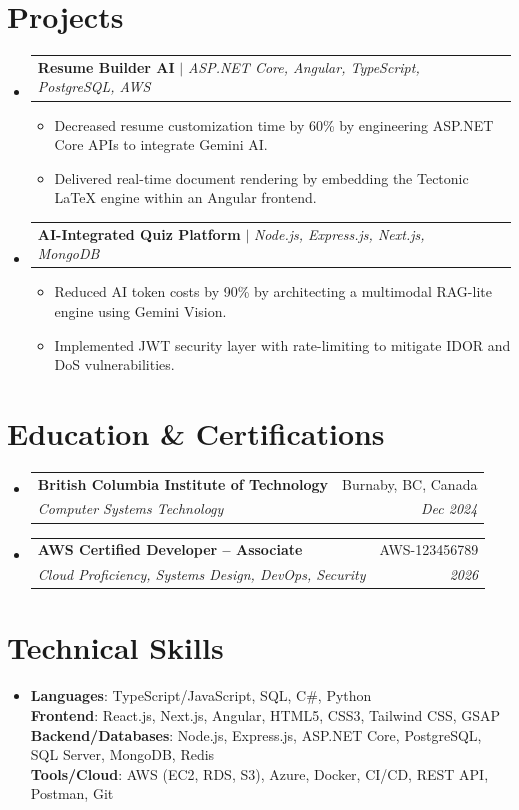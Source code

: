 \documentclass[letterpaper,11pt]{article}
\makeatletter
\newcommand{\resumeItem}[1]{
\item\small{
{#1 \vspace{-2pt}}
}
}
\newcommand{\resumeSubheading}[4]{
\vspace{-2pt}\item
\begin{tabular*}{0.97\textwidth}[t]{l@{\extracolsep{\fill}}r}
\textbf{#1} & #2 \\
\textit{\small#3} & \textit{\small #4} \\
\end{tabular*}\vspace{-7pt}
}
\newcommand{\resumeProjectHeading}[2]{
\item
\begin{tabular*}{0.97\textwidth}{l@{\extracolsep{\fill}}r}
\small#1 & #2 \\
\end{tabular*}\vspace{-7pt}
}
\newcommand{\resumeSubHeadingListStart}{\begin{itemize}[leftmargin=0.15in, label={}]}
\newcommand{\resumeSubHeadingListEnd}{\end{itemize}}
\newcommand{\resumeItemListStart}{\begin{itemize}}
\newcommand{\resumeItemListEnd}{\end{itemize}\vspace{-5pt}}
\makeatother
\begin{document}
\section{Projects}
\resumeSubHeadingListStart
\resumeProjectHeading{\textbf{Resume Builder AI} $|$ \emph{ASP.NET Core, Angular, TypeScript, PostgreSQL, AWS}}{}
\resumeItemListStart
\resumeItem{Decreased resume customization time by 60\% by engineering ASP.NET Core APIs to integrate Gemini AI.}
\resumeItem{Delivered real-time document rendering by embedding the Tectonic LaTeX engine within an Angular frontend.}
\resumeItemListEnd
\resumeProjectHeading{\textbf{AI-Integrated Quiz Platform} $|$ \emph{Node.js, Express.js, Next.js, MongoDB}}{}
\resumeItemListStart
\resumeItem{Reduced AI token costs by 90\% by architecting a multimodal RAG-lite engine using Gemini Vision.}
\resumeItem{Implemented JWT security layer with rate-limiting to mitigate IDOR and DoS vulnerabilities.}
\resumeItemListEnd
\resumeSubHeadingListEnd

\section{Education \& Certifications}
\resumeSubHeadingListStart
\resumeSubheading{British Columbia Institute of Technology}{Burnaby, BC, Canada}{Computer Systems Technology}{Dec 2024}
\resumeSubheading{AWS Certified Developer -- Associate}{AWS-123456789}{Cloud Proficiency, Systems Design, DevOps, Security}{2026}
\resumeSubHeadingListEnd

\section{Technical Skills}
\begin{itemize}[leftmargin=0.15in, label={}]
\item{
\textbf{Languages}{: TypeScript/JavaScript, SQL, C\#, Python} \\
\textbf{Frontend}{: React.js, Next.js, Angular, HTML5, CSS3, Tailwind CSS, GSAP} \\
\textbf{Backend/Databases}{: Node.js, Express.js, ASP.NET Core, PostgreSQL, SQL Server, MongoDB, Redis} \\
\textbf{Tools/Cloud}{: AWS (EC2, RDS, S3), Azure, Docker, CI/CD, REST API, Postman, Git}
}
\end{itemize}
\end{document}
